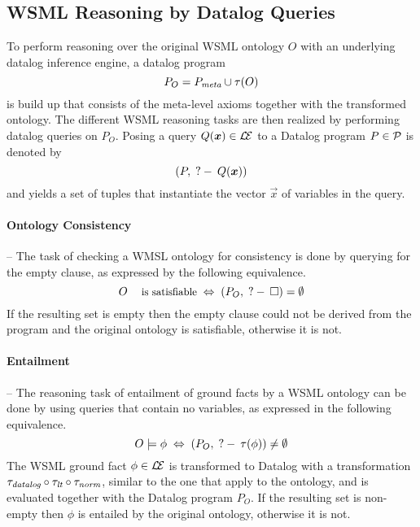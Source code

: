 \subsection{WSML Reasoning by Datalog Queries}

To perform reasoning over the original WSML ontology $O$ with an
underlying datalog inference engine, a datalog program
\begin{displaymath}
    P_O = \mlaxioms \cup \tau(O)
\end{displaymath}
is build up that consists of the meta-level axioms together with
the transformed ontology. The different WSML reasoning tasks are
then realized by performing datalog queries on $P_O$. Posing a
query $Q(\vec{x}) \in \LE$ to a Datalog program $P \in \P$ is
denoted by
$$(P,\qury Q(\vec{x}))$$ and yields a set of tuples that instantiate
the vector $\vec{x}$ of variables in the query.

\paragraph{Ontology Consistency} -- The task of checking a WMSL
ontology for consistency is done by querying for the empty clause,
as expressed by the following equivalence.
\begin{displaymath}
    O \; \textrm{\footnotesize{is satisfiable}} \; \Leftrightarrow \; (P_O , \qury \square) =
    \emptyset
\end{displaymath}
If the resulting set is empty then the empty clause could not be
derived from the program and the original ontology is satisfiable,
otherwise it is not.

\paragraph{Entailment} -- The reasoning task of entailment of
ground facts by a WSML ontology can be done by using queries that
contain no variables, as expressed in the following equivalence.
\begin{displaymath}
    O \models \phi \; \Leftrightarrow \; (P_O, \qury
    \tau(\phi)) \not= \emptyset
\end{displaymath}
The WSML ground fact $\phi \in \LE$ is transformed to Datalog with
a transformation $\transdlog \circ \translt \circ \transnorm$,
similar to the one that apply to the ontology, and is evaluated
together with the Datalog program $P_O$. If the resulting set is
non-empty then $\phi$ is entailed by the original ontology,
otherwise it is not.

